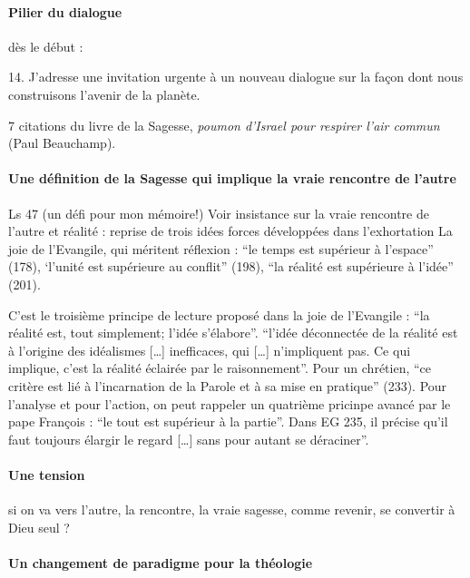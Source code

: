 \paragraph{Pilier du dialogue} dès le début : 
\begin{singlequote}
    14. J’adresse une invitation urgente à un nouveau dialogue sur la façon dont nous construisons l’avenir de la planète. 
\end{singlequote}
 7 citations du livre de la Sagesse, \textit{poumon d'Israel pour respirer l'air commun} (Paul Beauchamp). 

\paragraph{Une définition de la Sagesse qui implique la vraie rencontre de l'autre} Ls 47 (un défi pour mon mémoire!) Voir  \cite{howles_quel_2022}
insistance sur la vraie rencontre de l'autre et réalité : 
 reprise de trois idées forces développées dans l’exhortation La joie de l’Evangile, qui méritent réflexion : “le temps est supérieur à l’espace” (178), ‘l’unité est supérieure au conflit” (198), “la réalité est supérieure à l’idée” (201).
\begin{singlequote}
C’est le troisième principe de lecture proposé dans la joie de l’Evangile : “la réalité est, tout simplement; l’idée s’élabore”.
“l’idée déconnectée de la réalité est à l’origine des idéalismes […] inefficaces, qui […] n’impliquent pas. Ce qui implique, c’est la réalité éclairée par le raisonnement”.
Pour un chrétien, “ce critère est lié à l’incarnation de la Parole et à sa mise en pratique” (233). Pour l’analyse et pour l’action, on peut rappeler un quatrième pricinpe avancé par le pape François : “le tout est supérieur à la partie”. Dans EG 235, il précise qu’il faut toujours élargir le regard […] sans pour autant se déraciner”. \cite{francois_loue_2020}
\end{singlequote}

\paragraph{Une tension} si on va vers l'autre, la rencontre, la vraie sagesse, comme revenir, se convertir à Dieu seul ? 

\paragraph{Un changement de paradigme pour la théologie}

